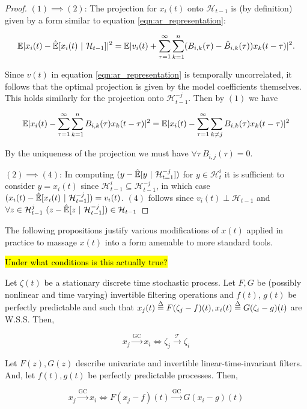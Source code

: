 \documentclass[12pt]{article}
\def\gc{\overset{\text{GC}}{\rightarrow}}  %
\def\te{\overset{\mathcal{T}}{\rightarrow}}  %
\def\H{\mathcal{H}}  %
\newcommand{\linE}[2]{\hat{\E}[#1\ |\ #2]}  %
\begin{document}
\begin{proof}
$(1) \implies (2)$: The projection for $x_i(t)$ onto $\H_{t - 1}$ is (by definition) given by a form similar to equation \ref{eqn:ar_representation}: 

\[
  \E|x_i(t) - \linE{x_i(t)}{\H_{t - 1}}|^2 = \E|v_i(t) + \sum_{\tau = 1}^\infty \sum_{k = 1}^n (B_{i, k}(\tau) - \hat{B}_{i, k}(\tau))x_k(t - \tau)|^2.
\]

 Since $v(t)$ in equation \ref{eqn:ar_representation} is temporally uncorrelated, it follows that the optimal projection is given by the model coefficients themselves.  This holds similarly for the projection onto $\H_{t - 1}^{-j}$.  Then by $(1)$ we have

\[
  \mathbb{E}|x_i(t) - \sum_{\tau = 1}^\infty \sum_{k = 1}^n B_{i, k}(\tau)x_k(t - \tau)|^2 = \mathbb{E}|x_i(t) - \sum_{\tau = 1}^\infty\sum_{k \ne j}B_{i, k}(\tau)x_k(t - \tau)|^2
\]

By the uniqueness of the projection we must have $\forall \tau\  B_{i, j}(\tau) = 0$.

$(2) \implies (4)$: In computing $(y - \linE{y}{\H_{t = 1}^{-j}})$ for $y \in \H_t^i$ it is sufficient to consider $y = x_i(t)$ since $\H_{t - 1}^i \subseteq \H_{t - 1}^{-j}$, in which case $(x_i(t) - \linE{x_i(t)}{\H_{t = 1}^{-j}}) = v_i(t)$.  $(4)$ follows since $v_i(t) \perp \H_{t - 1}$ and $\forall z \in \H_{t - 1}^j\ (z - \linE{z}{\H_{t - 1}^{-j}}) \in \H_{t - 1}$
  
\end{proof}

The following propositions justify various modifications of $x(t)$
applied in practice to massage $x(t)$ into a form amenable to more
standard tools.

\begin{theorem}
  \hl{Under what conditions is this actually true?}

  Let $\zeta(t)$ be a stationary discrete time stochastic process.  Let
  $F, G$ be (possibly nonlinear and time varying) invertible filtering
  operations and $f(t)$, $g(t)$ be perfectly predictable and such that
  $x_j(t) \overset{\Delta}{=} F(\zeta_j - f)(t), x_i(t) \overset{\Delta}{=} G(\zeta_i - g)(t)$ are W.S.S.  Then,

\begin{equation}
    x_j \gc x_i \iff \zeta_j \te \zeta_i
  \end{equation}
\end{theorem}

\begin{corollary}
  Let $F(z), G(z)$ describe univariate and invertible
  linear-time-invariant filters.  And, let $f(t), g(t)$ be perfectly
  predictable processes.  Then,

  \begin{equation}
    x_j \gc x_i \iff F(x_j - f)(t) \gc G(x_i - g)(t)
  \end{equation}
\end{corollary}
\end{document}
